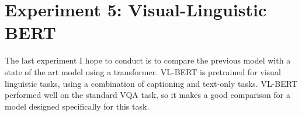 
\section{Experiment 5: Visual-Linguistic BERT}
The last experiment I hope to conduct is to compare the previous model with a state of the art model using a transformer. VL-BERT is pretrained for visual linguistic tasks, using a combination of captioning and text-only tasks\cite{VLBERT}. VL-BERT performed well on the standard VQA task, so it makes a good comparison for a model designed specifically for this task. 


